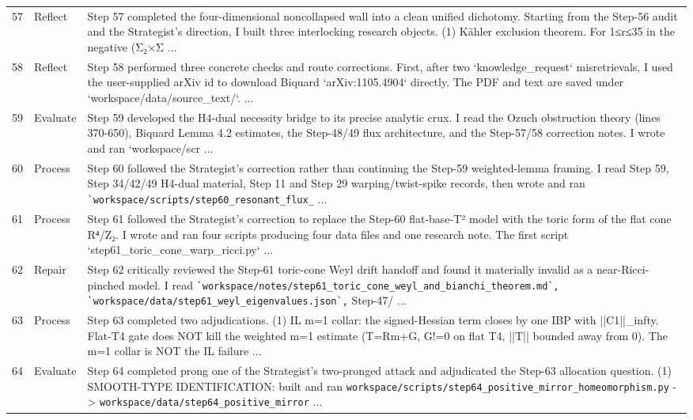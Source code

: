 \documentclass[UTF8,fontset=fandol,zihao=-4]{ctexart}
\begin{document}
\begin{longtable}{r p{} >{\raggedright\arraybackslash}p{}}
57 & Reflect & Step 57 completed the four-dimensional noncollapsed wall into a clean unified dichotomy. Starting from the Step-56 audit and the Strategist's direction, I built three interlocking research objects. (1) Kähler exclusion theorem. For 1≤r≤35 in the negative (Σ₂×Σ ...\\
58 & Reflect & Step 58 performed three concrete checks and route corrections. First, after two `knowledge\_request` misretrievals, I used the user-supplied arXiv id to download Biquard `arXiv:1105.4904` directly. The PDF and text are saved under `workspace/data/source\_text/`. ...\\
59 & Evaluate & Step 59 developed the H4-dual necessity bridge to its precise analytic crux. I read the Ozuch obstruction theory (lines 370-650), Biquard Lemma 4.2 estimates, the Step-48/49 flux architecture, and the Step-57/58 correction notes. I wrote and ran `workspace/scr ...\\
60 & Process & Step 60 followed the Strategist's correction rather than continuing the Step-59 weighted-lemma framing. I read Step 59, Step 34/42/49 H4-dual material, Step 11 and Step 29 warping/twist-spike records, then wrote and ran \nolinkurl{`workspace/scripts/step60_resonant_flux_} ...\\
61 & Process & Step 61 followed the Strategist's correction to replace the Step-60 flat-base-T² model with the toric form of the flat cone R⁴/Z₂. I wrote and ran four scripts producing four data files and one research note. The first script `step61\_toric\_cone\_warp\_ricci.py`  ...\\
62 & Repair & Step 62 critically reviewed the Step-61 toric-cone Weyl drift handoff and found it materially invalid as a near-Ricci-pinched model. I read \nolinkurl{`workspace/notes/step61_toric_cone_weyl_and_bianchi_theorem.md`,} \nolinkurl{`workspace/data/step61_weyl_eigenvalues.json`,} Step-47/ ...\\
63 & Process & Step 63 completed two adjudications. (1) IL m=1 collar: the signed-Hessian term closes by one IBP with ||C1||\_infty. Flat-T4 gate does NOT kill the weighted m=1 estimate (T=Rm+G, G!=0 on flat T4, ||T|| bounded away from 0). The m=1 collar is NOT the IL failure ...\\
64 & Evaluate & Step 64 completed prong one of the Strategist's two-pronged attack and adjudicated the Step-63 allocation question. (1) SMOOTH-TYPE IDENTIFICATION: built and ran \nolinkurl{workspace/scripts/step64_positive_mirror_homeomorphism.py} -> \nolinkurl{workspace/data/step64_positive_mirror} ...\\

\end{longtable}
\end{document}
